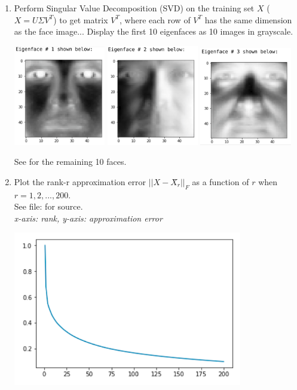\documentclass{report}
\begin{document}
\begin{enumerate}
\begin{enumerate}[label=(\alph*)]
\begin{center}
		\end{center}
		\item Perform Singular Value Decomposition (SVD) on the training set $X$ ($X = UΣV^{T} $) to get matrix $V^T$, where each row of $V^T$ has the same dimension as the face image... Display the first 10 eigenfaces as 10 images in grayscale. 
		\begin{center}
		\includegraphics[width=4cm]{images/eface1.png}
		\includegraphics[width=4cm]{images/eface2.png}
		\includegraphics[width=4cm]{images/eface3.png}
		\end{center}
		See  for the remaining 10 faces.
		\newpage
		\item Plot the rank-r approximation error $||X - X̂_r||_F$ as a function of $r$ when $r = 1, 2, . . . , 200$. \\ 
		See file:  for source.\\
		\textit{x-axis: rank, y-axis: approximation error} 
		\begin{center}
		\includegraphics[width=10cm]{images/rank_error.png}

\end{center}
\end{enumerate}
\end{enumerate}
\end{document}
